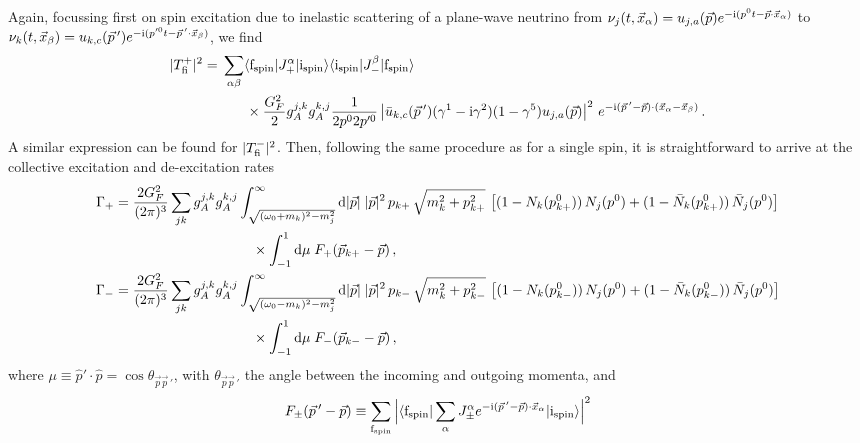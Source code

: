 \documentclass[aps,prd,10pt,twocolumn,superscriptaddress,floatfix,nofootinbib,amsmath,amssymb,altaffilletter,preprintnumbers]{revtex4-1}
\begin{document}
Again, focussing first on spin excitation due to inelastic scattering of a plane-wave neutrino from $\nu_j(t,\vec{x}_\alpha) = u_{j,a}(\vec{p})  e^{-{\rm i} (p^0t-\vec{p}\cdot\vec{x}_\alpha)}$ to $\nu_k(t,\vec{x}_\beta) = u_{k,c}(\vec{p}\,')  e^{-{\rm i} (p'^0t-\vec{p}\,'\cdot\vec{x}_\beta)}$, we find
\begin{equation}
\begin{aligned}
 |T^{+}_{\rm fi} |^2 = &\;  \sum_{\alpha \beta} \langle {\rm f}_{\rm spin}|  J_+^\alpha |{\rm i}_{\rm spin}\rangle
 \langle {\rm i}_{\rm spin}|  J_-^\beta |{\rm f}_{\rm spin} \rangle \\
 &\qquad \times \frac{G_F^2}{2} g_A^{j,k} g_A^{k,j}  \frac{1}{2p^{0}2p'^{0}} \left| \bar{u}_{k,c}(\vec{p}\,') (\gamma^1 - {\rm i} \gamma^2)(1- \gamma^5) u_{j,a}(\vec{p})\right|^2\, e^{-{\rm i}(\vec{p}\,' -\vec{p})\cdot(\vec{x}_\alpha-\vec{x}_\beta)} \, .
    \end{aligned}
    \end{equation}
A similar expression can be found for $|T^{-}_{\rm fi}|^2$.
Then, following the same procedure as for a single spin, it is straightforward to arrive at the collective excitation and  de-excitation rates
\begin{equation}
\begin{aligned}
\Gamma_{+}
    =&\;\frac{2G_F^2}{(2 \pi)^3} \sum_{jk} g_A^{j,k} g_A^{k,j}  
    \int_{\sqrt{(\omega_0+m_k)^2-m_j^2}}^\infty  {\rm d} |\vec{p}| \; |\vec{p}|^2\, p_{k+}\, \sqrt{m_k^2+p^2_{k+}} \,  
    \left[(1-N_{k}(p^0_{k+})) \, N_{j}(p^0)  +(1-\bar{N}_{k}(p^0_{k+}))\, \bar{N}_{j}(p^0)\right]\\
    &\; \hspace{30mm} \times\int_{-1}^1 {\rm d} \mu \; F_+(\vec{p}_{k+}-\vec{p})\, , \\
\Gamma_{-}= &\;\frac{2G_F^2}{(2 \pi)^3} \sum_{jk} g_A^{j,k} g_A^{k,j}  
    \int_{\sqrt{(\omega_0-m_k)^2-m_j^2}}^\infty  {\rm d} |\vec{p}|\; |\vec{p}|^2\, p_{k-}\, \sqrt{m_k^2+p^2_{k-}} \,  
    \left[(1-N_{k}(p^0_{k-})) \, N_{j}(p^0)  +(1-\bar{N}_{k}(p^0_{k-}))\, \bar{N}_{j}(p^0)\right]\\
    &\; \hspace{30mm} \times\int_{-1}^1 {\rm d} \mu \; F_-(\vec{p}_{k-}-\vec{p})\, ,
    \label{eq:BigGamma}
    \end{aligned}
\end{equation}
where $\mu \equiv \hat{p}' \cdot \hat{p}=\cos\theta_{\vec{p}\vec{p}\,'}$, with $\theta_{\vec{p}\vec{p}\,'}$ the angle between the incoming and outgoing momenta, and
\begin{equation}
F_\pm(\vec{p}\,'-\vec{p}) \equiv \sum_{\rm f_{spin}}\Big|\langle {\rm f}_{\rm spin}| \sum_\alpha  J_\pm^\alpha e^{-{\rm i} (\vec{p}\,' - \vec{p}) \cdot\vec{x}_\alpha}|{\rm i}_{\rm spin}\rangle \Big|^2
\label{eq:formfactors}
\end{equation}
\end{document}
